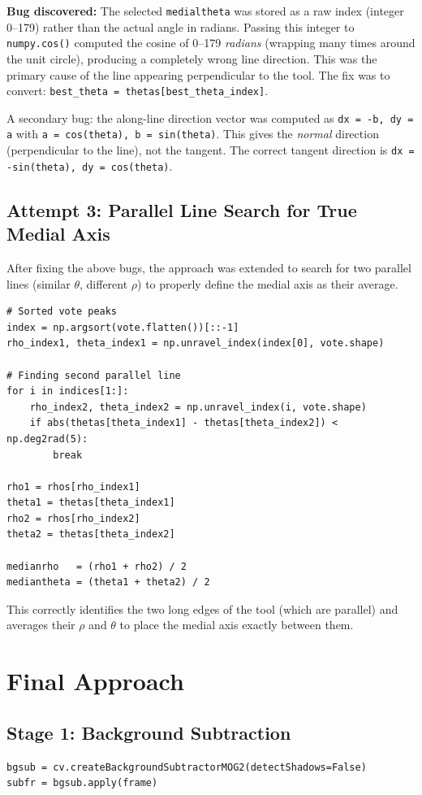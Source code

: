 \documentclass[journal]{IEEEtran}
\begin{document}
\textbf{Bug discovered:} The selected \texttt{medialtheta} was stored as a 
raw index (integer 0--179) rather than the actual angle in radians. Passing 
this integer to \texttt{numpy.cos()} computed the cosine of 0--179 \emph{radians} 
(wrapping many times around the unit circle), producing a completely wrong 
line direction. This was the primary cause of the line appearing perpendicular 
to the tool. The fix was to convert: \texttt{best\_theta = thetas[best\_theta\_index]}.

A secondary bug: the along-line direction vector was computed as 
\texttt{dx = -b, dy = a} with \texttt{a = cos(theta), b = sin(theta)}. 
This gives the \emph{normal} direction (perpendicular to the line), not the 
tangent. The correct tangent direction is \texttt{dx = -sin(theta), dy = cos(theta)}.

\subsection{Attempt 3: Parallel Line Search for True Medial Axis}
After fixing the above bugs, the approach was extended to search for two 
parallel lines (similar $\theta$, different $\rho$) to properly define 
the medial axis as their average.

\begin{lstlisting}
# Sorted vote peaks
index = np.argsort(vote.flatten())[::-1]
rho_index1, theta_index1 = np.unravel_index(index[0], vote.shape)

# Finding second parallel line
for i in indices[1:]:
    rho_index2, theta_index2 = np.unravel_index(i, vote.shape)
    if abs(thetas[theta_index1] - thetas[theta_index2]) < np.deg2rad(5):
        break

rho1 = rhos[rho_index1]
theta1 = thetas[theta_index1]
rho2 = rhos[rho_index2]
theta2 = thetas[theta_index2]

medianrho   = (rho1 + rho2) / 2
mediantheta = (theta1 + theta2) / 2
\end{lstlisting}

This correctly identifies the two long edges of the tool (which are parallel) 
and averages their $\rho$ and $\theta$ to place the medial axis exactly between them.

\section{Final Approach}

\subsection{Stage 1: Background Subtraction}
\begin{lstlisting}
bgsub = cv.createBackgroundSubtractorMOG2(detectShadows=False)
subfr = bgsub.apply(frame)
\end{lstlisting}
\end{document}
